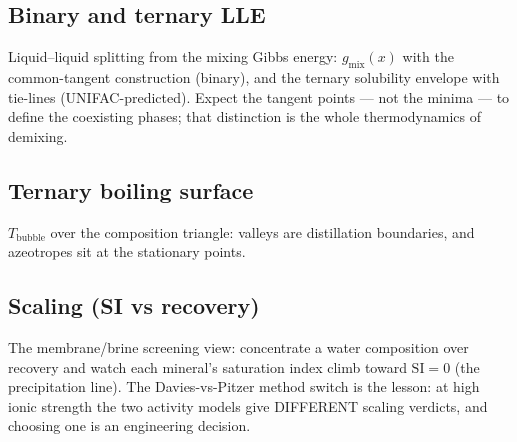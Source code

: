 \documentclass[11pt,a4paper]{article}
\begin{document}
\subsection{Binary and ternary LLE}
Liquid--liquid splitting from the mixing Gibbs energy: $g_{\mathrm{mix}}(x)$
with the common-tangent construction (binary), and the ternary solubility
envelope with tie-lines (UNIFAC-predicted).  Expect the tangent points ---
not the minima --- to define the coexisting phases; that distinction is the
whole thermodynamics of demixing.

\subsection{Ternary boiling surface}
$T_{\mathrm{bubble}}$ over the composition triangle: valleys are
distillation boundaries, and azeotropes sit at the stationary points.

\subsection{Scaling (SI vs recovery)}
The membrane/brine screening view: concentrate a water composition over
recovery and watch each mineral's saturation index climb toward
$\mathrm{SI} = 0$ (the precipitation line).  The Davies-vs-Pitzer method
switch is the lesson: at high ionic strength the two activity models give
DIFFERENT scaling verdicts, and choosing one is an engineering decision.
\end{document}
